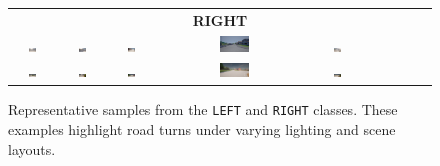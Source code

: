\begin{figure}[htbp]
\begin{tabular}{cccccccccc}
        \multicolumn{10}{c}{\textbf{RIGHT}} \\
        \includegraphics[width=0.2\textwidth]{img/diversity/right_01.png} &
        \includegraphics[width=0.2\textwidth]{img/diversity/right_02.png} &
        \includegraphics[width=0.2\textwidth]{img/diversity/right_03.png} &
        \includegraphics[width=0.2\textwidth]{img/diversity/right_04.png} &
        \includegraphics[width=0.2\textwidth]{img/diversity/right_05.png} & \\
        \includegraphics[width=0.2\textwidth]{img/diversity/right_06.png} &
        \includegraphics[width=0.2\textwidth]{img/diversity/right_07.png} &
        \includegraphics[width=0.2\textwidth]{img/diversity/right_08.png} &
        \includegraphics[width=0.2\textwidth]{img/diversity/right_09.png} &
        \includegraphics[width=0.2\textwidth]{img/diversity/right_10.png} \\
    \end{tabular}
    \caption[Dataset diversity — LEFT and RIGHT classes]{%
Representative samples from the \texttt{LEFT} and \texttt{RIGHT} classes. These examples highlight road turns under varying lighting and scene layouts.}
    \label{fig:diversity_left_right}
\end{figure}
